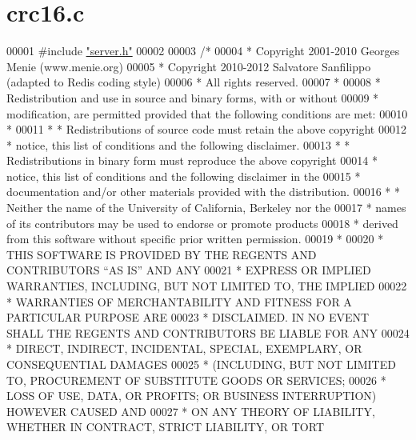 \hypertarget{crc16_8c_source}{}\section{crc16.\+c}
\label{crc16_8c_source}

\begin{DoxyCode}
00001 \textcolor{preprocessor}{#}\textcolor{preprocessor}{include} \hyperlink{server_8h}{"server.h"}
00002 
00003 \textcolor{comment}{/*}
00004 \textcolor{comment}{ * Copyright 2001-2010 Georges Menie (www.menie.org)}
00005 \textcolor{comment}{ * Copyright 2010-2012 Salvatore Sanfilippo (adapted to Redis coding style)}
00006 \textcolor{comment}{ * All rights reserved.}
00007 \textcolor{comment}{ *}
00008 \textcolor{comment}{ * Redistribution and use in source and binary forms, with or without}
00009 \textcolor{comment}{ * modification, are permitted provided that the following conditions are met:}
00010 \textcolor{comment}{ *}
00011 \textcolor{comment}{ *     * Redistributions of source code must retain the above copyright}
00012 \textcolor{comment}{ *       notice, this list of conditions and the following disclaimer.}
00013 \textcolor{comment}{ *     * Redistributions in binary form must reproduce the above copyright}
00014 \textcolor{comment}{ *       notice, this list of conditions and the following disclaimer in the}
00015 \textcolor{comment}{ *       documentation and/or other materials provided with the distribution.}
00016 \textcolor{comment}{ *     * Neither the name of the University of California, Berkeley nor the}
00017 \textcolor{comment}{ *       names of its contributors may be used to endorse or promote products}
00018 \textcolor{comment}{ *       derived from this software without specific prior written permission.}
00019 \textcolor{comment}{ *}
00020 \textcolor{comment}{ * THIS SOFTWARE IS PROVIDED BY THE REGENTS AND CONTRIBUTORS ``AS IS'' AND ANY}
00021 \textcolor{comment}{ * EXPRESS OR IMPLIED WARRANTIES, INCLUDING, BUT NOT LIMITED TO, THE IMPLIED}
00022 \textcolor{comment}{ * WARRANTIES OF MERCHANTABILITY AND FITNESS FOR A PARTICULAR PURPOSE ARE}
00023 \textcolor{comment}{ * DISCLAIMED. IN NO EVENT SHALL THE REGENTS AND CONTRIBUTORS BE LIABLE FOR ANY}
00024 \textcolor{comment}{ * DIRECT, INDIRECT, INCIDENTAL, SPECIAL, EXEMPLARY, OR CONSEQUENTIAL DAMAGES}
00025 \textcolor{comment}{ * (INCLUDING, BUT NOT LIMITED TO, PROCUREMENT OF SUBSTITUTE GOODS OR SERVICES;}
00026 \textcolor{comment}{ * LOSS OF USE, DATA, OR PROFITS; OR BUSINESS INTERRUPTION) HOWEVER CAUSED AND}
00027 \textcolor{comment}{ * ON ANY THEORY OF LIABILITY, WHETHER IN CONTRACT, STRICT LIABILITY, OR TORT}

\end{DoxyCode}
